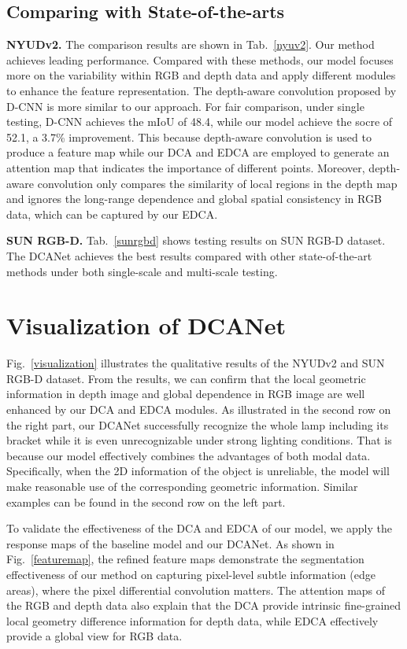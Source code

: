 \documentclass[10pt,twocolumn,letterpaper]{article}
\begin{document}
\subsection{Comparing with State-of-the-arts}
\textbf{NYUDv2.} The comparison results are shown in Tab.~\ref{nyuv2}. Our method achieves leading performance. Compared with these methods,
our model focuses more on the variability within RGB and depth data and apply different modules to enhance the feature
representation. The depth-aware convolution proposed by D-CNN \cite{wang2018depth} is more similar to our approach. For fair comparison, under single testing, D-CNN achieves the mIoU of 48.4, while our model achieve the socre of 52.1, a 3.7\% improvement. This because
depth-aware convolution is used to produce a feature map while our DCA and EDCA are employed to generate an attention map that
indicates the importance of different points. Moreover, depth-aware convolution only compares the similarity of local regions
in the depth map and ignores the long-range dependence and global spatial consistency in RGB data, which can be captured by our EDCA.



\textbf{SUN RGB-D.}
Tab.~\ref{sunrgbd} shows testing results on SUN RGB-D dataset. The DCANet achieves the best results compared with other state-of-the-art methods under both single-scale and multi-scale testing.


\section{Visualization of DCANet}
Fig.~\ref{visualization} illustrates the qualitative results of the NYUDv2 and SUN RGB-D dataset. From the results, we can confirm
that the local geometric information in depth image and global dependence in RGB image are well enhanced by our DCA and EDCA modules. As illustrated in the second row on the right part, our DCANet successfully recognize the whole lamp including its bracket while it is even unrecognizable under strong lighting conditions. That is because our model effectively combines the advantages of both modal data. Specifically, when the 2D information of the object is unreliable, the model will make reasonable use of the corresponding geometric information. Similar examples can be found in
the second row on the left part.

To validate the effectiveness of the DCA and EDCA of our model, we apply the response maps of the baseline model and our DCANet. As shown in Fig.~\ref{featuremap}, the refined feature maps demonstrate the segmentation effectiveness of our method on capturing pixel-level subtle information (edge areas), where
the pixel differential convolution matters. The attention maps of the RGB and depth data also explain that the DCA provide intrinsic fine-grained local geometry difference information for depth data, while EDCA effectively provide a global view for RGB data.
\end{document}
